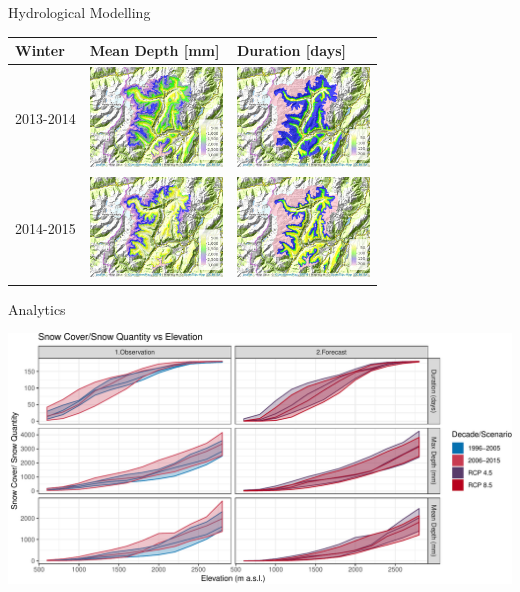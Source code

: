 \documentclass[
  ignorenonframetext,
]{beamer}
\begin{document}
\begin{frame}{Hydrological Modelling}
\protect\hypertarget{hydrological-modelling-1}{}
\begin{longtable}[]{@{}lll@{}}
\toprule
Winter & Mean Depth {[}mm{]} & Duration {[}days{]}\tabularnewline
\midrule
\endhead
2013-2014 &
\includegraphics[width=\textwidth,height=1.04167in]{resources/images/map/mean_OBS_2014_winter.png}
&
\includegraphics[width=\textwidth,height=1.04167in]{resources/images/map/nday_OBS_2014_winter.png}\tabularnewline
2014-2015 &
\includegraphics[width=\textwidth,height=1.04167in]{resources/images/map/mean_OBS_2015_winter.png}
&
\includegraphics[width=\textwidth,height=1.04167in]{resources/images/map/nday_OBS_2015_winter.png}\tabularnewline
\bottomrule
\end{longtable}
\end{frame}

\begin{frame}{Analytics}
\protect\hypertarget{analytics}{}
\begin{center}\includegraphics[width=0.9\linewidth]{introduction_presentation_modified_colors_files/figure-beamer/snow-altitude-1} \end{center}
\end{frame}
\end{document}
